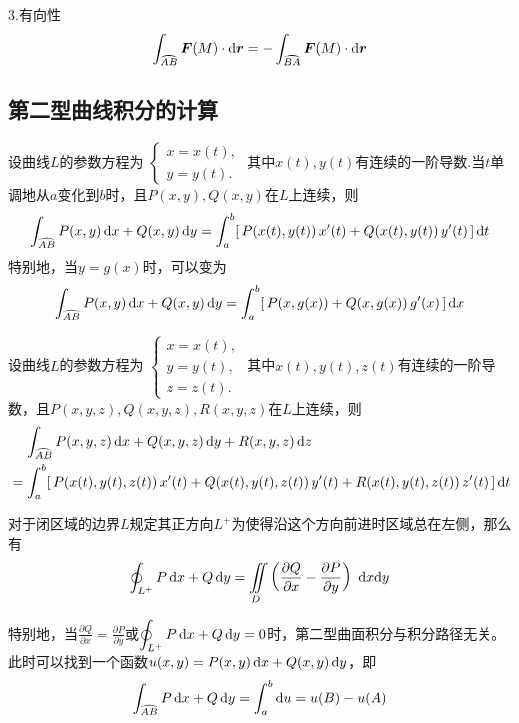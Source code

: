 3.有向性
\begin{equation}
	\int_{\wideparen{AB}}\bm{F}(M) \cdot \d \bm{r} = -\int_{\wideparen{BA}}\bm{F}(M) \cdot \d \bm{r}
\end{equation}

\subsection{第二型曲线积分的计算}
\vspace*{-1em}

\theorem[平面曲线下第二型曲线积分的计算]
设曲线$L$的参数方程为
$
\begin{cases}
	x = x(t),\\
	y = y(t).
\end{cases}
$
其中$x(t),y(t)$有连续的一阶导数.当$t$单调地从$a$变化到$b$时，且$P(x,y),Q(x,y)$在$L$上连续，则
\begin{equation}
	\int_{\wideparen{AB}}P(x,y)\,\d x+Q(x,y)\,\d y = \int_{a}^{b}[\,P(x(t),y(t))\,x'(t) + Q(x(t),y(t))\,y'(t) \,]\,\d t
\end{equation}
特别地，当$y=g(x)$时，可以变为
\begin{equation}
	\int_{\wideparen{AB}}P(x,y)\,\d x+Q(x,y)\,\d y = \int_{a}^{b}[\,P(x,g(x)) + Q(x,g(x))\,g'(x) \,]\,\d x
\end{equation}

\vspace*{-1em}

\theorem[空间曲线下第二型曲线积分的计算]
设曲线$L$的参数方程为
$
\begin{cases}
	x = x(t),\\
	y = y(t),\\
	z =z(t).
\end{cases}
$
其中$x(t),y(t),z(t)$有连续的一阶导数，且$P(x,y,z),Q(x,y,z),R(x,y,z)$在$L$上连续，则
\begin{equation}
	\begin{split}
		&\quad \,\int_{\wideparen{AB}}P(x,y,z)\,\d x+Q(x,y,z)\,\d y +R(x,y,z)\, \d z\\
		&= \int_{a}^{b}[\,P(x(t),y(t),z(t))\,x'(t) + Q(x(t),y(t),z(t))\,y'(t) + R(x(t),y(t),z(t))\,z'(t) \,]\,\d t
	\end{split}
\end{equation}

\theorem[格林公式]
对于闭区域的边界$L$规定其正方向$L^+$为使得沿这个方向前进时区域总在左侧，那么有
\begin{equation}
	\oint_{L^+}P\,{\rm{d}} x+Q\,{\rm{d}} y = \iint\limits_{D}\left( \frac{\partial Q}{\partial x} -\frac{\partial P}{\partial y}\right) \,\, {\rm{d}} x {\rm{d}} y
\end{equation}
\par 特别地，当$\displaystyle\frac{\partial Q}{\partial x} =\frac{\partial P}{\partial y}$或$\displaystyle \oint_{L^+}P\,{\rm{d}} x+Q\,{\rm{d}} y =0$时，第二型曲面积分与积分路径无关。\\[0.5em]
此时可以找到一个函数$u(x,y)=P(x,y) \, {\rm{d}} x+Q(x,y)\,{\rm{d}} y$，即
\begin{equation}
	\int_{\wideparen{AB}}P\,\d x+Q\,\d y  =\int_{a}^{b} \d u = u(B)-u(A)
\end{equation}
\newpage

